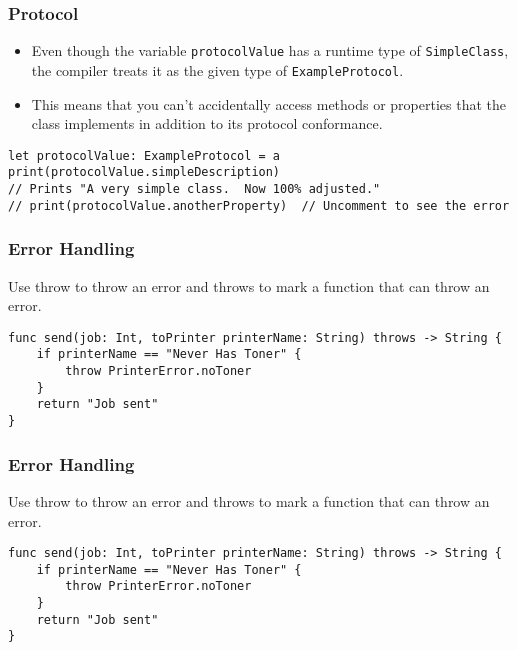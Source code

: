 \begin{frame}[fragile] \frametitle{Protocol}

\begin{itemize}
\item Even though the variable \lstinline|protocolValue| has a runtime type of \lstinline|SimpleClass|, the compiler treats it as the given type of \lstinline|ExampleProtocol|. 
\item This means that you can’t accidentally access methods or properties that the class implements in addition to its protocol conformance.
\end{itemize}

\begin{lstlisting}[basicstyle=\scriptsize]
let protocolValue: ExampleProtocol = a
print(protocolValue.simpleDescription)
// Prints "A very simple class.  Now 100% adjusted."
// print(protocolValue.anotherProperty)  // Uncomment to see the error
\end{lstlisting}
\end{frame}

\begin{frame}[fragile] \frametitle{Error Handling}


Use throw to throw an error and throws to mark a function that can throw an error. 

\begin{lstlisting}[basicstyle=\scriptsize]
func send(job: Int, toPrinter printerName: String) throws -> String {
    if printerName == "Never Has Toner" {
        throw PrinterError.noToner
    }
    return "Job sent"
}
\end{lstlisting}


\end{frame}

\begin{frame}[fragile] \frametitle{Error Handling}

Use throw to throw an error and throws to mark a function that can throw an error. 

\begin{lstlisting}[basicstyle=\scriptsize]
func send(job: Int, toPrinter printerName: String) throws -> String {
    if printerName == "Never Has Toner" {
        throw PrinterError.noToner
    }
    return "Job sent"
}
\end{lstlisting}


\end{frame}


